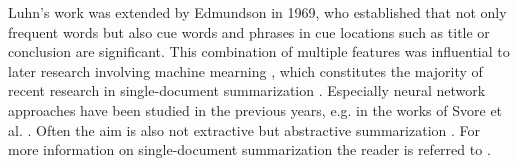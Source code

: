 Luhn's work \cite{DBLP:journals/ibmrd/Luhn58} was extended by Edmundson \cite{DBLP:journals/jacm/Edmundson69} in 1969, who established that not only frequent words but also cue words and phrases in cue locations such as title or conclusion are significant. This combination of multiple features was influential to later research involving machine mearning \cite{DBLP:books/sp/mining2012/NenkovaM12}, which constitutes the majority of recent research in single-document summarization \cite{Das07asurvey}. Especially neural network approaches have been studied in the previous years, e.g. in the works of Svore et al. \cite{DBLP:conf/emnlp/SvoreVB07}. Often the aim is also not extractive but abstractive summarization \cite{Khandelwal2016NeuralTS, DBLP:conf/conll/NallapatiZSGX16, DBLP:conf/emnlp/RushCW15, DBLP:journals/corr/PaulusXS17}. For more information on single-document summarization the reader is referred to \cite{Das07asurvey, Gupta2010ASO, DBLP:books/sp/mining2012/NenkovaM12}.

